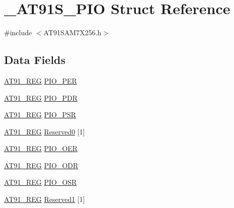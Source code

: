 \hypertarget{struct__AT91S__PIO}{\section{\-\_\-\-A\-T91\-S\-\_\-\-P\-I\-O Struct Reference}
\label{struct__AT91S__PIO}
}


{\ttfamily \#include $<$A\-T91\-S\-A\-M7\-X256.\-h$>$}

\subsection*{Data Fields}
\begin{DoxyCompactItemize}
\item 
\hyperlink{GCC_2ARM7__AT91SAM7S_2AT91SAM7X256_8h_a712ad5a1ac1bd02f3e95a7526c283ce1}{A\-T91\-\_\-\-R\-E\-G} \hyperlink{struct__AT91S__PIO_a6219ff0520bc90a0c1eef988bd253d48}{P\-I\-O\-\_\-\-P\-E\-R}
\item 
\hyperlink{GCC_2ARM7__AT91SAM7S_2AT91SAM7X256_8h_a712ad5a1ac1bd02f3e95a7526c283ce1}{A\-T91\-\_\-\-R\-E\-G} \hyperlink{struct__AT91S__PIO_a1562c48486ffd8abe50d80ae6c37ec8f}{P\-I\-O\-\_\-\-P\-D\-R}
\item 
\hyperlink{GCC_2ARM7__AT91SAM7S_2AT91SAM7X256_8h_a712ad5a1ac1bd02f3e95a7526c283ce1}{A\-T91\-\_\-\-R\-E\-G} \hyperlink{struct__AT91S__PIO_a05c0cb31a5592c29fc2e499463be3184}{P\-I\-O\-\_\-\-P\-S\-R}
\item 
\hyperlink{GCC_2ARM7__AT91SAM7S_2AT91SAM7X256_8h_a712ad5a1ac1bd02f3e95a7526c283ce1}{A\-T91\-\_\-\-R\-E\-G} \hyperlink{struct__AT91S__PIO_a04904720c11b78e63134fadf6a71f4fc}{Reserved0} \mbox{[}1\mbox{]}
\item 
\hyperlink{GCC_2ARM7__AT91SAM7S_2AT91SAM7X256_8h_a712ad5a1ac1bd02f3e95a7526c283ce1}{A\-T91\-\_\-\-R\-E\-G} \hyperlink{struct__AT91S__PIO_ad98a2d712fd626ab4e7f4a03a67b92a3}{P\-I\-O\-\_\-\-O\-E\-R}
\item 
\hyperlink{GCC_2ARM7__AT91SAM7S_2AT91SAM7X256_8h_a712ad5a1ac1bd02f3e95a7526c283ce1}{A\-T91\-\_\-\-R\-E\-G} \hyperlink{struct__AT91S__PIO_a7994c9c78ecec3f0793d60c6e7701d5d}{P\-I\-O\-\_\-\-O\-D\-R}
\item 
\hyperlink{GCC_2ARM7__AT91SAM7S_2AT91SAM7X256_8h_a712ad5a1ac1bd02f3e95a7526c283ce1}{A\-T91\-\_\-\-R\-E\-G} \hyperlink{struct__AT91S__PIO_a104b2e81a10a1fc02b327bf9ec570d23}{P\-I\-O\-\_\-\-O\-S\-R}
\item 
\hyperlink{GCC_2ARM7__AT91SAM7S_2AT91SAM7X256_8h_a712ad5a1ac1bd02f3e95a7526c283ce1}{A\-T91\-\_\-\-R\-E\-G} \hyperlink{struct__AT91S__PIO_a8d0eed279cd1fcc9d0d9d22e5f6e4d15}{Reserved1} \mbox{[}1\mbox{]}

\end{DoxyCompactItemize}
